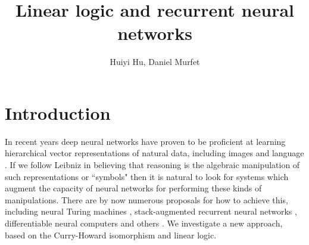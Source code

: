 \documentclass[english,letter paper,12pt,leqno]{article}
\theoremstyle{example}
\numberwithin{equation}{section}
\def\res{\operatorname{Res}}
\begin{document}
\def\Res{\res\!}
\newcommand{\ud}{\mathrm{d}}
\newcommand{\Ress}[1]{\res_{#1}\!}
\newcommand{\cat}[1]{\mathcal{#1}}
\newcommand{\lto}{\longrightarrow}
\newcommand{\xlto}[1]{\stackrel{#1}\lto}
\newcommand{\mf}[1]{\mathfrak{#1}}
\newcommand{\md}[1]{\mathscr{#1}}
\def\sus{\l}
\def\l{\,|\,}
\def\sgn{\textup{sgn}}
\newcommand{\den}[1]{\llbracket #1 \rrbracket}
\def\inta{\textbf{int}}
\def\binta{\textbf{bint}}
\def\comp{\underline{\textup{comp}}}
\def\mult{\underline{\textup{mult}}}
\def\repeat{\underline{\textup{repeat}}}
\def\master{\underline{\textup{master}}}

\DeclarePairedDelimiter\bra{\langle}{\rvert}
\DeclarePairedDelimiter\ket{\lvert}{\rangle}

\title{Linear logic and recurrent neural networks}
\author{Huiyi Hu, Daniel Murfet}

\maketitle

\section{Introduction}

In recent years deep neural networks have proven to be proficient at learning hierarchical vector representations of natural data, including images and language \cite{dlnature}. If we follow Leibniz \cite{frege} in believing that reasoning is the algebraic manipulation of such representations or ``symbols" then it is natural to look for systems which augment the capacity of neural networks for performing these kinds of manipulations. There are by now numerous proposals for how to achieve this, including neural Turing machines \cite{ntm}, stack-augmented recurrent neural networks \cite{joulin}, differentiable neural computers \cite{dnc} and others \cite{graves_etal, grefen, weston, tarlow}. We investigate a new approach, based on the Curry-Howard isomorphism and linear logic.
\end{document}
